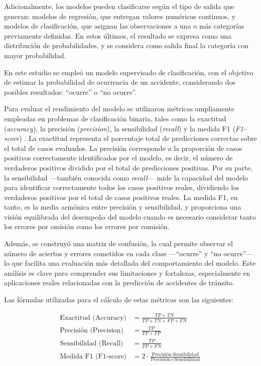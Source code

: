 \documentclass[12pt]{article}
\begin{document}
Adicionalmente, los modelos pueden clasificarse según el tipo de salida que generan: modelos de regresión, que entregan valores numéricos continuos, y modelos de clasificación, que asignan las observaciones a una o más categorías previamente definidas. En estos últimos, el resultado se expresa como una distribución de probabilidades, y se considera como salida final la categoría con mayor probabilidad.

En este estudio se empleó un modelo supervisado de clasificación, con el objetivo de estimar la probabilidad de ocurrencia de un accidente, considerando dos posibles resultados: “ocurre” o “no ocurre”.

Para evaluar el rendimiento del modelo se utilizaron métricas ampliamente empleadas en problemas de clasificación binaria, tales como la exactitud (\textit{accuracy}), la precisión (\textit{precision}), la sensibilidad (\textit{recall}) y la medida F1 (\textit{F1-score}) \citep{manning2008}. La exactitud representa el porcentaje total de predicciones correctas sobre el total de casos evaluados. La precisión corresponde a la proporción de casos positivos correctamente identificados por el modelo, es decir, el número de verdaderos positivos dividido por el total de predicciones positivas. Por su parte, la sensibilidad —también conocida como \textit{recall}— mide la capacidad del modelo para identificar correctamente todos los casos positivos reales, dividiendo los verdaderos positivos por el total de casos positivos reales. La medida F1, en tanto, es la media armónica entre precisión y sensibilidad, y proporciona una visión equilibrada del desempeño del modelo cuando es necesario considerar tanto los errores por omisión como los errores por comisión.

Además, se construyó una matriz de confusión, la cual permite observar el número de aciertos y errores cometidos en cada clase —“ocurre” y “no ocurre”— lo que facilita una evaluación más detallada del comportamiento del modelo. Este análisis es clave para comprender sus limitaciones y fortalezas, especialmente en aplicaciones reales relacionadas con la predicción de accidentes de tránsito.

Las fórmulas utilizadas para el cálculo de estas métricas son las siguientes:

\[
\begin{aligned}
\text{Exactitud (Accuracy)} &= \frac{TP + TN}{TP + TN + FP + FN} \\
\text{Precisión (Precision)} &= \frac{TP}{TP + FP} \\
\text{Sensibilidad (Recall)} &= \frac{TP}{TP + FN} \\
\text{Medida F1 (F1-score)} &= 2 \cdot \frac{\text{Precisión} \cdot \text{Sensibilidad}}{\text{Precisión} + \text{Sensibilidad}}
\end{aligned}
\]
\end{document}
